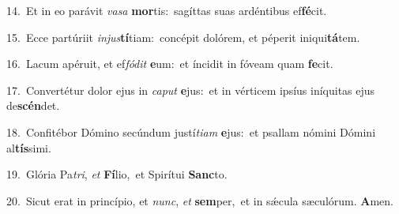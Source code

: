 {\numbfont\textcolor{\numbcolor}{14.}}~Et in eo parávit \textit{va}\-\textit{sa} \textbf{mor}\-tis:~\star sagíttas suas ardéntibus ef\-\textbf{fé}\-cit.\par
{\numbfont\textcolor{\numbcolor}{15.}}~Ecce partúriit \textit{in}\-\textit{jus}\textbf{tí}tiam:~\star concépit dolórem, et péperit iniqui\-\textbf{tá}\-tem.\par
{\numbfont\textcolor{\numbcolor}{16.}}~Lacum apéruit, et ef\-\textit{fó}\-\textit{dit} \textbf{e}\-um:~\star et íncidit in fóveam quam \textbf{fe}\-cit.\par
{\numbfont\textcolor{\numbcolor}{17.}}~Convertétur dolor ejus in \textit{ca}\-\textit{put} \textbf{e}\-jus:~\star et in vérticem ipsíus iníquitas ejus de\-\textbf{scén}\-det.\par
{\numbfont\textcolor{\numbcolor}{18.}}~Confitébor Dómino secúndum justí\-\textit{ti}\-\textit{am} \textbf{e}\-jus:~\star et psallam nómini Dómini al\-\textbf{tís}\-simi.\par
{\numbfont\textcolor{\numbcolor}{19.}}~Glória Pa\-\textit{tri}\-, \textit{et} \textbf{Fí}\-lio,~\star et Spirítui \textbf{Sanc}\-to.\par
{\numbfont\textcolor{\numbcolor}{20.}}~Sicut erat in princípio, et \textit{nunc}\-, \textit{et} \textbf{sem}\-per,~\star et in sǽcula sæculórum. \textbf{A}\-men.\par
